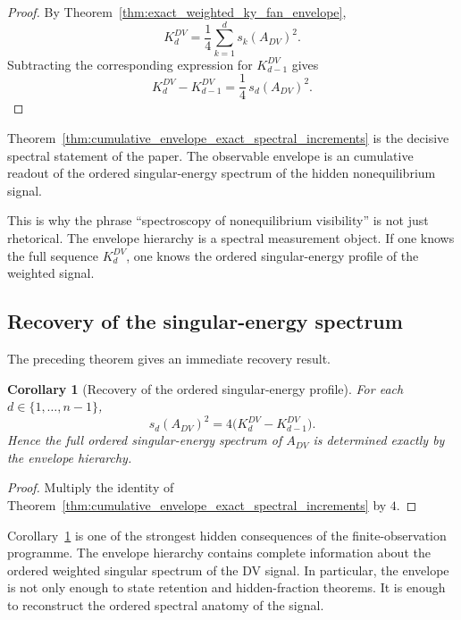 \documentclass[11pt,a4paper]{article}
\numberwithin{equation}{section}
\theoremstyle{thmcompact}
\newtheorem{corollary}[theorem]{Corollary}
\theoremstyle{remark}
\begin{document}
\begin{proof}
By Theorem~\ref{thm:exact_weighted_ky_fan_envelope},
\begin{equation}
K_d^{DV}
=
\frac14\sum_{k=1}^{d}s_k(A_{DV})^2.
\end{equation}
Subtracting the corresponding expression for \(K_{d-1}^{DV}\) gives
\begin{equation}
K_d^{DV}-K_{d-1}^{DV}
=
\frac14\,s_d(A_{DV})^2.
\end{equation}
\end{proof}

Theorem~\ref{thm:cumulative_envelope_exact_spectral_increments} is the decisive spectral statement of the paper. The observable envelope is an cumulative readout of the ordered singular-energy spectrum of the hidden nonequilibrium signal.

This is why the phrase ``spectroscopy of nonequilibrium visibility'' is not just rhetorical. The envelope hierarchy is a spectral measurement object. If one knows the full sequence \(K_d^{DV}\), one knows the ordered singular-energy profile of the weighted signal.

\subsection{Recovery of the singular-energy spectrum}

The preceding theorem gives an immediate recovery result.

\begin{corollary}[Recovery of the ordered singular-energy profile]
\label{cor:exact_recovery_singular_energy_profile}
For each \(d\in\{1,\dots,n-1\}\),
\begin{equation}
s_d(A_{DV})^2
=
4\bigl(K_d^{DV}-K_{d-1}^{DV}\bigr).
\end{equation}
Hence the full ordered singular-energy spectrum of \(A_{DV}\) is determined exactly by the envelope hierarchy.
\end{corollary}

\begin{proof}
Multiply the identity of Theorem~\ref{thm:cumulative_envelope_exact_spectral_increments} by \(4\).
\end{proof}

Corollary~\ref{cor:exact_recovery_singular_energy_profile} is one of the strongest hidden consequences of the finite-observation programme. The envelope hierarchy contains complete information about the ordered weighted singular spectrum of the DV signal. In particular, the envelope is not only enough to state retention and hidden-fraction theorems. It is enough to reconstruct the ordered spectral anatomy of the signal.
\end{document}

